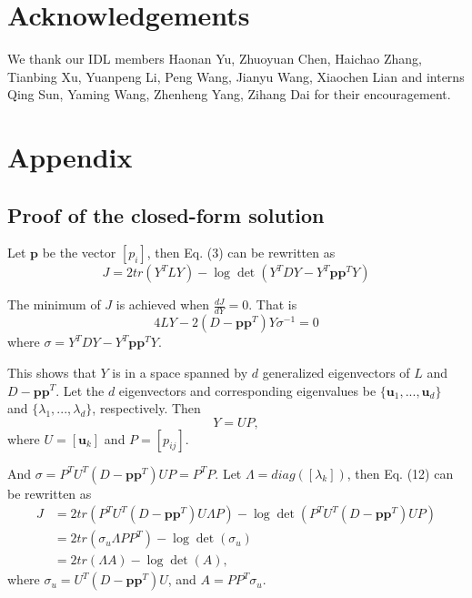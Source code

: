 \documentclass{article}
\begin{document}
\section*{Acknowledgements}
We thank our IDL members Haonan Yu, Zhuoyuan Chen, Haichao Zhang, Tianbing Xu,
Yuanpeng Li, Peng Wang, Jianyu Wang, Xiaochen Lian and interns Qing Sun, Yaming Wang, 
Zhenheng Yang, Zihang Dai for their encouragement.





\appendix
\section{Appendix}
\subsection{Proof of the closed-form solution}
Let $\mathbf{p}$ be the vector $[p_i]$, then Eq. (3) can be rewritten as
\begin{equation}
J = 2tr(Y^TLY) - \log\det(Y^TDY - Y^T\mathbf{p}\mathbf{p}^TY)
\end{equation}

The minimum of $J$ is achieved when $\frac{dJ}{dY}=0$. That is
\begin{equation}
4LY - 2(D-\mathbf{p}\mathbf{p}^T)Y\sigma^{-1} = 0
\end{equation}
where $\sigma = Y^TDY - Y^T\mathbf{p}\mathbf{p}^TY$.

This shows that $Y$ is in a space spanned by $d$ generalized eigenvectors of
$L$ and $D-\mathbf{p}\mathbf{p}^T$. Let the $d$ eigenvectors and corresponding
eigenvalues be $\{\mathbf{u}_1, ..., \mathbf{u}_d\}$ and $\{\lambda_1, ..., \lambda_d\}$, respectively.
Then 
\begin{equation}
Y = UP,
\end{equation}
where $U=[\mathbf{u}_k]$ and $P=[p_{ij}]$.

And $\sigma=P^TU^T(D-\mathbf{pp}^T)UP = P^TP$.
Let $\Lambda = diag([\lambda_k])$, then Eq. (12) can be rewritten as 
\begin{align}
J &= 2tr(P^TU^T(D-\mathbf{pp}^T)U\Lambda P) - \log\det(P^TU^T(D-\mathbf{pp}^T)UP) \\
  &= 2tr(\sigma_u\Lambda PP^T) - \log\det(\sigma_u) \\
  &= 2tr(\Lambda A) - \log\det(A),
\end{align}
where $\sigma_u = U^T(D-\mathbf{pp}^T)U$, and $A = PP^T\sigma_u$.
\end{document}
